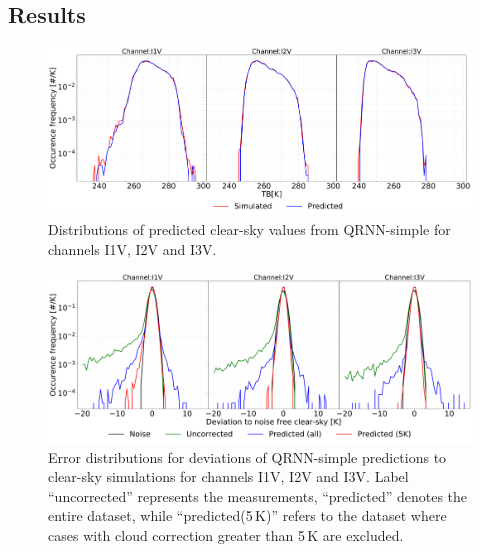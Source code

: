 \documentclass[amt, manuscript]{copernicus}
\begin{document}
\subsection{Results}
%
\begin{figure}[t]
	\includegraphics[width=\textwidth]{Figures/PDF_predictions_ICI.pdf} 
	\caption{Distributions of predicted clear-sky values from QRNN-simple for channels I1V, I2V and I3V. }
	\label{fig:PDF_predictions}	
\end{figure}
\begin{figure}[t ]
	\includegraphics[width=\textwidth]{Figures/error_distribution_QRNN-single.pdf} 
	\caption{Error distributions for deviations of QRNN-simple predictions to clear-sky simulations for channels I1V, I2V and I3V. Label ``uncorrected'' represents the measurements, ``predicted'' denotes the entire dataset, while ``predicted(5\,K)'' refers to the dataset where cases with cloud correction greater than 5\,K are excluded.}
	\label{fig:error_distributions}	
\end{figure}
\end{document}
